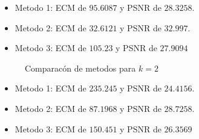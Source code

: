 \begin{itemize}
 \item Metodo 1: ECM de $95.6087$ y PSNR de $28.3258$.
 \item Metodo 2: ECM de $32.6121$ y PSNR de $32.997$.
 \item Metodo 3: ECM de $105.23$ y PSNR de $27.9094$
\end{itemize}

\begin{figure}[H]
    \centering
    \qquad
    \qquad
    \caption{Comparacón de metodos para $k = 2$}%
    \label{fig:example}%
\end{figure}

\begin{itemize}
 \item Metodo 1: ECM de $235.245$ y PSNR de $24.4156$.
 \item Metodo 2: ECM de $87.1968$ y PSNR de $28.7258$.
 \item Metodo 3: ECM de $150.451$ y PSNR de $26.3569$
\end{itemize}

